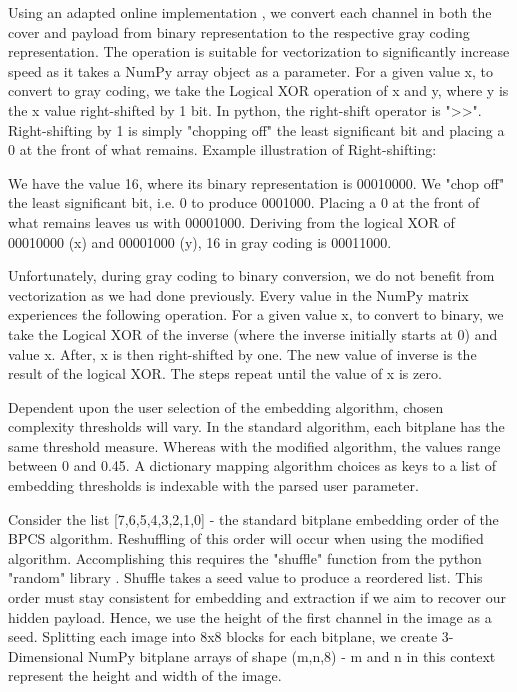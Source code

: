 \documentclass{l4proj}
\begin{document}
Using an adapted online implementation \citep{gray-code-conversion}, we convert each channel in both the cover and payload from binary representation to the respective gray coding representation. The operation is suitable for vectorization to significantly increase speed as it takes a NumPy array object as a parameter.  For a given value x, to convert to gray coding, we take the Logical XOR operation of x and y, where y is the x value right-shifted by 1 bit. In python, the right-shift operator is ">>". Right-shifting by 1 is simply "chopping off" the least significant bit and placing a 0 at the front of what remains. Example illustration of Right-shifting:

We have the value 16, where its binary representation is 00010000. We "chop off" the least significant bit, i.e. 0 to produce 0001000. Placing a 0 at the front of what remains leaves us with 00001000. Deriving from the logical XOR of 00010000 (x) and 00001000 (y), 16 in gray coding is 00011000. 

Unfortunately, during gray coding to binary conversion, we do not benefit from vectorization as we had done previously. Every value in the NumPy matrix experiences the following operation. For a given value x, to convert to binary, we take the Logical XOR of the inverse (where the inverse initially starts at 0) and value x. After, x is then right-shifted by one. The new value of inverse is the result of the logical XOR. The steps repeat until the value of x is zero. 

Dependent upon the user selection of the embedding algorithm, chosen complexity thresholds will vary. In the standard algorithm, each bitplane has the same threshold measure. Whereas with the modified algorithm, the values range between 0 and 0.45. A dictionary mapping algorithm choices as keys to a list of embedding thresholds is indexable with the parsed user parameter. 

Consider the list [7,6,5,4,3,2,1,0] - the standard bitplane embedding order of the BPCS algorithm. Reshuffling of this order will occur when using the modified algorithm. Accomplishing this requires the "shuffle" function from the python "random" library \citep{random}. Shuffle takes a seed value to produce a reordered list. This order must stay consistent for embedding and extraction if we aim to recover our hidden payload. Hence, we use the height of the first channel in the image as a seed. Splitting each image into 8x8 blocks for each bitplane, we create 3-Dimensional NumPy bitplane arrays of shape (m,n,8) - m and n in this context represent the height and width of the image.
\end{document}

